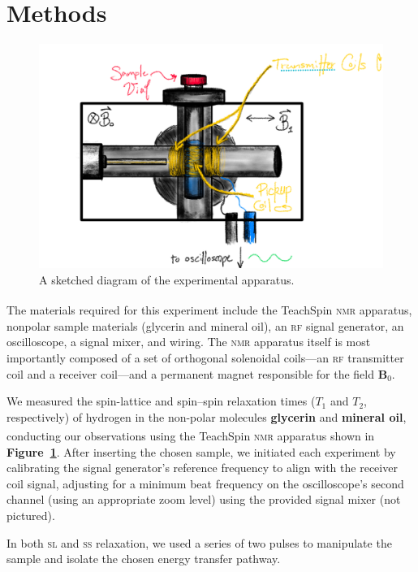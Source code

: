 \documentclass[12pt]{report}
\begin{document}
\section*{Methods}
{
    \begin{figure}[tbh]
        \centering
        \includegraphics[width=6in]{5-nmr/overleaf/images/diagram.jpg}
        \caption{A sketched diagram of the experimental apparatus.}
        \label{fig:experiment-diagram}
    \end{figure}

    The materials required for this experiment include the TeachSpin\textsuperscript{\tiny\textregistered} \textsc{nmr} apparatus, nonpolar sample materials (glycerin and mineral oil), an \textsc{rf} signal generator, an oscilloscope, a signal mixer, and wiring. The \textsc{nmr} apparatus itself is most importantly composed of a set of orthogonal solenoidal coils—an \textsc{rf} transmitter coil and a receiver coil—and a permanent magnet responsible for the field $\bm{B}_0$.
    
    We measured the spin-lattice and spin–spin relaxation times ($T_1$ and $T_2$, respectively) of hydrogen in the non-polar molecules \textbf{glycerin} and \textbf{mineral oil}, conducting our observations using the TeachSpin\textsuperscript{\tiny\textregistered} \textsc{nmr} apparatus shown in \textbf{Figure~\ref{fig:experiment-diagram}}. After inserting the chosen sample, we initiated each experiment by calibrating the signal generator’s reference frequency to align with the receiver coil signal, adjusting for a minimum beat frequency on the oscilloscope’s second channel (using an appropriate zoom level) using the provided signal mixer (not pictured).

    In both \textsc{sl} and \textsc{ss} relaxation, we used a series of two pulses to manipulate the sample and isolate the chosen energy transfer pathway.
}
\end{document}
